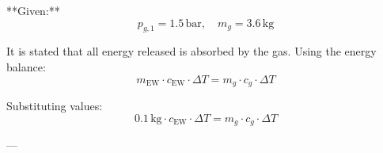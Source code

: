 **Given:**  
\[
p_{g,1} = 1.5 \, \text{bar}, \quad m_g = 3.6 \, \text{kg}
\]  

It is stated that all energy released is absorbed by the gas. Using the energy balance:  
\[
m_{\text{EW}} \cdot c_{\text{EW}} \cdot \Delta T = m_g \cdot c_{g} \cdot \Delta T
\]  

Substituting values:  
\[
0.1 \, \text{kg} \cdot c_{\text{EW}} \cdot \Delta T = m_g \cdot c_{g} \cdot \Delta T
\]  

---